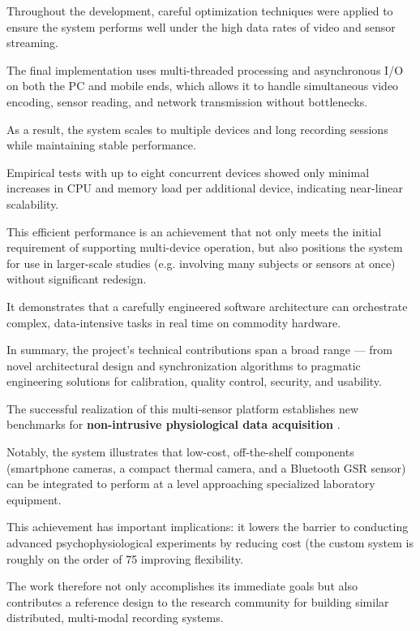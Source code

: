 \begin{itemize}
Throughout the development, careful optimization techniques were applied to ensure
the system performs well under the high data rates of video and sensor streaming.

The final implementation uses multi-threaded processing and asynchronous I/O on both
the PC and mobile ends, which allows it to handle simultaneous video encoding, sensor
reading, and network transmission without bottlenecks.

As a result, the system scales to multiple devices and long recording sessions while
maintaining stable performance.

Empirical tests with up to eight concurrent devices showed only minimal increases in
CPU and memory load per additional device, indicating near-linear scalability.

This efficient performance is an achievement that not only meets the initial
requirement of supporting multi-device operation, but also positions the system for
use in larger-scale studies (e.g.  involving many subjects or sensors at once)
without significant redesign.

It demonstrates that a carefully engineered software architecture can orchestrate
complex, data-intensive tasks in real time on commodity hardware.

\end{itemize}

In summary, the project's technical contributions span a broad range --- from novel
architectural design and synchronization algorithms to pragmatic engineering
solutions for calibration, quality control, security, and usability.

The successful realization of this multi-sensor platform establishes new benchmarks
for \textbf{non-intrusive physiological data acquisition}
.

Notably, the system illustrates that low-cost, off-the-shelf components (smartphone
cameras, a compact thermal camera, and a Bluetooth GSR sensor) can be integrated to
perform at a level approaching specialized laboratory equipment.

This achievement has important implications: it lowers the barrier to conducting
advanced psychophysiological experiments by reducing cost (the custom system is
roughly on the order of 75%
improving flexibility.

The work therefore not only accomplishes its immediate goals but also contributes a
reference design to the research community for building similar distributed,
multi-modal recording systems.

